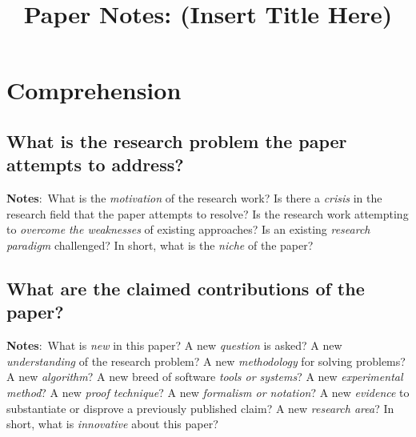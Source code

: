 \documentclass{article}
\begin{document}
\titleformat{\section}{\normalfont\scshape}{\thesection}{1em}{}
\titleformat{\subsection}{\small}{\thesubsection}{1em}{}
\newcommand{\mynote}[1]{{
	\begin{samepage}
	\footnotesize{
		\textbf{Notes}:~#1
	}
	\vspace*{5cm}
	\end{samepage}
}}
\newcommand{\myquestion}[1]{{\subsection{#1}}\vspace*{1.2cm}}

\setlength{\droptitle}{-5em}

\title{Paper Notes: (Insert Title Here)\vspace{-2ex}}
\author{}
\date{}

\maketitle
\vspace{-6em}

\section{Comprehension}
\subsection{What is the research problem the paper attempts to address?}
\mynote{What is the \emph{motivation} of the research work? Is there a \emph{crisis} in the research ﬁeld that the paper attempts to resolve? Is the research work attempting to \emph{overcome the weaknesses} of existing approaches? Is an existing \emph{research paradigm} challenged? In short, what is the \emph{niche} of the paper?}

\subsection{What are the claimed contributions of the paper?}
\mynote{What is \emph{new} in this paper?  A new \emph{question} is asked? A new \emph{understanding} of the research problem? A new \emph{methodology} for solving problems? A new \emph{algorithm}? A new breed of software \emph{tools or systems}? A new \emph{experimental method}? A new \emph{proof technique}? A new \emph{formalism or notation}? A new \emph{evidence} to substantiate or disprove a previously published claim?  A new \emph{research area}? In short, what is \emph{innovative} about this paper?} 
\end{document}
